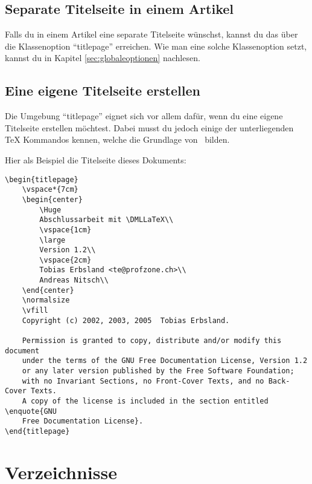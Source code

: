 \subsection{Separate Titelseite in einem Artikel}
\label{sec:separatetitelseite}

Falls du in einem Artikel eine separate Titelseite wünschst, kannst du das über die Klassenoption \enquote{titlepage} erreichen. Wie man eine solche Klassenoption setzt, kannst du in Kapitel \ref{sec:globaleoptionen} nachlesen.

\subsection{Eine eigene Titelseite erstellen}

Die Umgebung \enquote{titlepage} eignet sich vor allem dafür, wenn du eine eigene Titelseite erstellen möchtest. Dabei musst du jedoch einige der unterliegenden {\rmfamily\TeX} Kommandos kennen, welche die Grundlage von \DMLLaTeX \ bilden.

Hier als Beispiel die Titelseite dieses Dokuments:

\begin{lstlisting}[frame=tb, caption=Titelseite dieses Dokuments]
\begin{titlepage}
	\vspace*{7cm}
	\begin{center}
		\Huge
		Abschlussarbeit mit \DMLLaTeX\\
		\vspace{1cm}
		\large
		Version 1.2\\
		\vspace{2cm}
		Tobias Erbsland <te@profzone.ch>\\
		Andreas Nitsch\\
	\end{center}
	\normalsize
	\vfill
	Copyright (c) 2002, 2003, 2005  Tobias Erbsland.

	Permission is granted to copy, distribute and/or modify this document
	under the terms of the GNU Free Documentation License, Version 1.2
	or any later version published by the Free Software Foundation;
	with no Invariant Sections, no Front-Cover Texts, and no Back-Cover Texts.
	A copy of the license is included in the section entitled \enquote{GNU
	Free Documentation License}.
\end{titlepage}
\end{lstlisting}

\section{Verzeichnisse}

